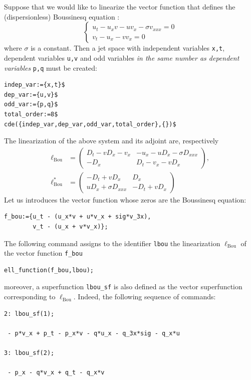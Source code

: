 Suppose that we would like to linearize the vector function that defines the
(dispersionless) Boussinesq equation \cite{KerstenKrasilshchikVerboretsky:2006}:
\begin{equation}
  \label{cdeeq:1}
  \left\{
  \begin{array}{l}
  u_t-u_xv-uv_x-\sigma v_{xxx}=0\\
  v_t-u_x-vv_x=0
\end{array}
\right.
\end{equation}
where $\sigma$ is a constant. Then a jet space with independent variables
\texttt{x,t}, dependent variables \texttt{u,v} and odd variables \emph{in the
  same number as dependent variables} \texttt{p,q} must be created:
\begin{verbatim}
indep_var:={x,t}$
dep_var:={u,v}$
odd_var:={p,q}$
total_order:=8$
cde({indep_var,dep_var,odd_var,total_order},{})$
\end{verbatim}
The linearization of the above system and its adjoint are, respectively
\begin{align*}
  \ell_{\text{Bou}}&=
  \begin{pmatrix}
    D_t-vD_x-v_x & -u_x-uD_x-\sigma D_{xxx}\\
    -D_x & D_t-v_x-vD_x
  \end{pmatrix},\\
  \ell^*_{\text{Bou}}&=
  \begin{pmatrix}
    -D_t+vD_x & D_x\\
    uD_x+\sigma D_{xxx} & -D_t+vD_x
  \end{pmatrix}
\end{align*}
Let us introduces the vector function whose zeros are the Boussinesq equation:
\begin{verbatim}
f_bou:={u_t - (u_x*v + u*v_x + sig*v_3x),
        v_t - (u_x + v*v_x)};
\end{verbatim}
The following command assigns to the identifier \texttt{lbou} the linearization
\cdiffop $\ell_{\text{Bou}}$ of the vector function \texttt{f\_bou}
\hypertarget{operator:ELL_FUNCTION}{}
\begin{verbatim}
ell_function(f_bou,lbou);
\end{verbatim}
moreover, a superfunction \texttt{lbou\_sf} is also defined as the vector
superfunction corresponding to $\ell_{\text{Bou}}$.
Indeed, the following sequence of commands:
\begin{verbatim}
2: lbou_sf(1);

 - p*v_x + p_t - p_x*v - q*u_x - q_3x*sig - q_x*u

3: lbou_sf(2);

 - p_x - q*v_x + q_t - q_x*v
\end{verbatim}
